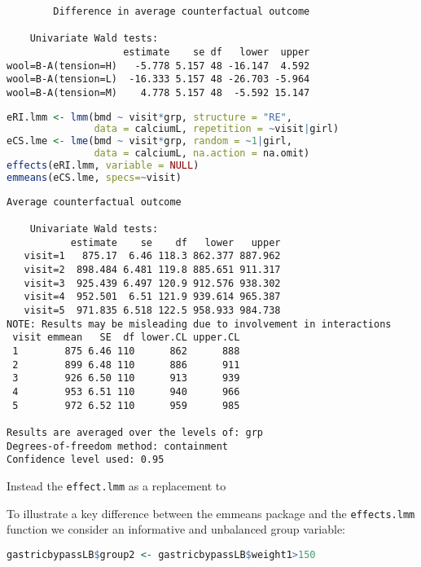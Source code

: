 \documentclass[12pt]{article}
\begin{document}
\label{}
\begin{verbatim}
		Difference in average counterfactual outcome

	Univariate Wald tests: 
                    estimate    se df   lower  upper
wool=B-A(tension=H)   -5.778 5.157 48 -16.147  4.592
wool=B-A(tension=L)  -16.333 5.157 48 -26.703 -5.964
wool=B-A(tension=M)    4.778 5.157 48  -5.592 15.147
\end{verbatim}





\begin{lstlisting}[language=r,numbers=none]
eRI.lmm <- lmm(bmd ~ visit*grp, structure = "RE",
               data = calciumL, repetition = ~visit|girl)
eCS.lme <- lme(bmd ~ visit*grp, random = ~1|girl,
               data = calciumL, na.action = na.omit)
effects(eRI.lmm, variable = NULL)
emmeans(eCS.lme, specs=~visit)

\end{lstlisting}

\label{}
\begin{verbatim}
Average counterfactual outcome

	Univariate Wald tests: 
           estimate    se    df   lower   upper
   visit=1   875.17  6.46 118.3 862.377 887.962
   visit=2  898.484 6.481 119.8 885.651 911.317
   visit=3  925.439 6.497 120.9 912.576 938.302
   visit=4  952.501  6.51 121.9 939.614 965.387
   visit=5  971.835 6.518 122.5 958.933 984.738
NOTE: Results may be misleading due to involvement in interactions
 visit emmean   SE  df lower.CL upper.CL
 1        875 6.46 110      862      888
 2        899 6.48 110      886      911
 3        926 6.50 110      913      939
 4        953 6.51 110      940      966
 5        972 6.52 110      959      985

Results are averaged over the levels of: grp 
Degrees-of-freedom method: containment 
Confidence level used: 0.95
\end{verbatim}


Instead the \texttt{effect.lmm} as a replacement to


To illustrate a key difference between the emmeans package and the
\texttt{effects.lmm} function we consider an informative and unbalanced group
variable:
\begin{lstlisting}[language=r,numbers=none]
gastricbypassLB$group2 <- gastricbypassLB$weight1>150
\end{lstlisting}
\end{document}
